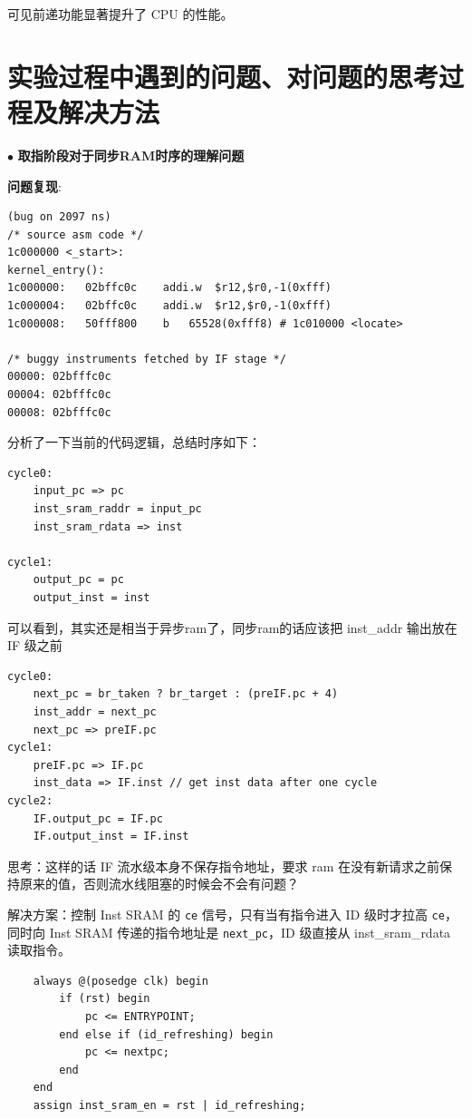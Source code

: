 \documentclass[11pt]{article}
\begin{document}
可见前递功能显著提升了 CPU 的性能。



\section{实验过程中遇到的问题、对问题的思考过程及解决方法}


\noindent
$\bullet$
\textbf{取指阶段对于同步RAM时序的理解问题}

\textbf{问题复现}:

\begin{lstlisting}
(bug on 2097 ns)
/* source asm code */
1c000000 <_start>:
kernel_entry():
1c000000:	02bffc0c 	addi.w	$r12,$r0,-1(0xfff)
1c000004:	02bffc0c 	addi.w	$r12,$r0,-1(0xfff)
1c000008:	50fff800 	b	65528(0xfff8) # 1c010000 <locate>

/* buggy instruments fetched by IF stage */
00000: 02bfffc0c
00004: 02bfffc0c
00008: 02bfffc0c
\end{lstlisting}

分析了一下当前的代码逻辑，总结时序如下：

\begin{lstlisting}
cycle0:
	input_pc => pc
	inst_sram_raddr = input_pc
	inst_sram_rdata => inst

cycle1:
	output_pc = pc	
	output_inst = inst
\end{lstlisting}

可以看到，其实还是相当于异步ram了，同步ram的话应该把 inst_addr 输出放在 IF 级之前

\begin{lstlisting}
cycle0:
	next_pc = br_taken ? br_target : (preIF.pc + 4)
	inst_addr = next_pc
	next_pc => preIF.pc
cycle1:
	preIF.pc => IF.pc
	inst_data => IF.inst // get inst data after one cycle
cycle2:
	IF.output_pc = IF.pc
	IF.output_inst = IF.inst
\end{lstlisting}

思考：这样的话 IF 流水级本身不保存指令地址，要求 ram 在没有新请求之前保持原来的值，否则流水线阻塞的时候会不会有问题？

解决方案：控制 Inst SRAM 的 \verb|ce| 信号，只有当有指令进入 ID 级时才拉高 \verb|ce|，同时向 Inst SRAM 传递的指令地址是 \verb|next_pc|，ID 级直接从 inst_sram_rdata 读取指令。

\begin{lstlisting}
    always @(posedge clk) begin
        if (rst) begin
            pc <= ENTRYPOINT;
        end else if (id_refreshing) begin
            pc <= nextpc;
        end
    end
    assign inst_sram_en = rst | id_refreshing;
\end{lstlisting}
\end{document}

